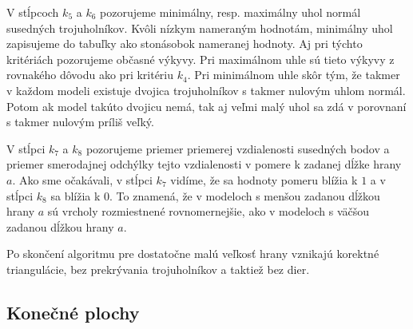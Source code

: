 V stĺpcoch $k_5$ a $k_6$ pozorujeme minimálny, resp. maximálny uhol normál susedných trojuholníkov.
Kvôli nízkym nameraným hodnotám, minimálny uhol zapisujeme do tabuľky ako stonásobok nameranej hodnoty. Aj 
pri týchto kritériách pozorujeme občasné výkyvy. Pri maximálnom uhle sú tieto výkyvy z rovnakého dôvodu
ako pri kritériu $k_4$. Pri minimálnom uhle skôr tým, že takmer v každom modeli existuje dvojica trojuholníkov
s takmer nulovým uhlom normál. Potom ak model takúto dvojicu nemá, tak aj veľmi malý uhol sa zdá v porovnaní s takmer
nulovým príliš veľký.

V stĺpci $k_7$ a $k_8$ pozorujeme priemer priemerej vzdialenosti susedných bodov a priemer smerodajnej odchýlky 
tejto vzdialenosti v pomere k zadanej dĺžke hrany $a$. Ako sme očakávali, v stĺpci $k_7$ vidíme, že sa hodnoty pomeru
blížia k $1$ a v stĺpci $k_8$ sa blížia k $0$. To znamená, že v modeloch s menšou zadanou dĺžkou hrany $a$ sú 
vrcholy rozmiestnené rovnomernejšie, ako v modeloch s väčšou zadanou dĺžkou hrany $a$.

Po skončení algoritmu pre dostatočne malú veľkosť hrany vznikajú korektné triangulácie,
bez prekrývania trojuholníkov a taktiež bez dier.

\subsection{Konečné plochy}

